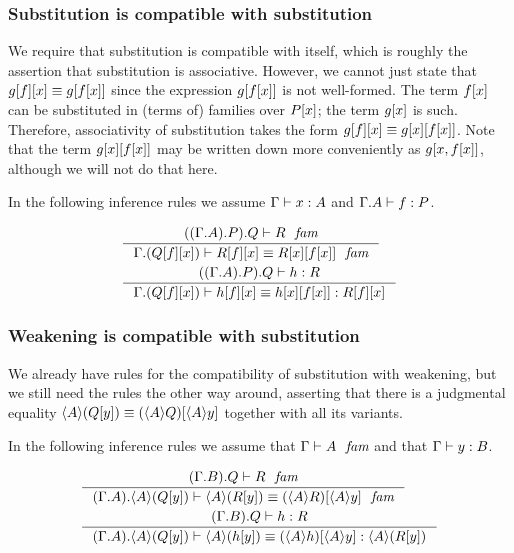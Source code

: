 \subsubsection{Substitution is compatible with substitution}\label{comp-ss}

We require that substitution is compatible with itself, which is roughly the
assertion that substitution is associative. However, we cannot just state that
$\subst{x}{{f}{g}}\jdeq\subst{{x}{f}}{g}$ since the expression $\subst{{x}{f}}{g}$
is not well-formed. The term $\subst{x}{f}$ can be substituted in (terms of) families over
$\subst{x}{P}$; the term $\subst{x}{g}$ is such. Therefore, associativity of
substitution takes the form $\subst{x}{{f}{g}}\jdeq\subst{{x}{f}}{{x}{g}}$.
Note that the term $\subst{{x}{f}}{{x}{g}}$ may be written down more conveniently
as $\subst{x,\subst{x}{f}}{g}$, although we will not do that here.

In the following inference rules we assume
$\jterm{\Gamma}{A}{x}$ and $\jterm{{\Gamma}{A}}{P}{f}$.

\begin{align}
& \inference
  {\jfam{{{{\Gamma}{A}}{P}}{Q}}{R}}
  {\jfameq{{\Gamma}{\subst{x}{{f}{Q}}}}{\subst{x}{{f}{R}}}{\subst{{x}{f}}{{x}{R}}}}
  \label{comp-ss-f}\\
& \inference
  {\jterm{{{{\Gamma}{A}}{P}}{Q}}{R}{h}}
  {\jtermeq{{\Gamma}{\subst{x}{{f}{Q}}}}{\subst{x}{{f}{R}}}{\subst{x}{{f}{h}}}{\subst{{x}{f}}{{x}{h}}}}
  \label{comp-ss-t}
\end{align}

\subsubsection{Weakening is compatible with substitution}\label{comp-ws}
We already have rules for the compatibility of substitution with weakening, but
we still need the rules the other way around, asserting that there is a 
judgmental equality $\ctxwk{A}{\subst{y}{Q}}\jdeq\subst{\ctxwk{A}{y}}{\ctxwk{A}{Q}}$
together with all its variants.

In the following inference rules we assume that $\jfam{\Gamma}{A}$ and that
$\jterm{\Gamma}{B}{y}$.

\begin{align}
& \inference
  {\jfam{{{\Gamma}{B}}{Q}}{R}}
  {\jfameq{{{\Gamma}{A}}{\ctxwk{A}{\subst{y}{Q}}}}{\ctxwk{A}{\subst{y}{R}}}{\subst{\ctxwk{A}{y}}{\ctxwk{A}{R}}}}
  \label{comp-ws-f}\\
& \inference
  {\jterm{{{\Gamma}{B}}{Q}}{R}{h}}
  {\jtermeq{{{\Gamma}{A}}{\ctxwk{A}{\subst{y}{Q}}}}{\ctxwk{A}{\subst{y}{R}}}{\ctxwk{A}{\subst{y}{h}}}{\subst{\ctxwk{A}{y}}{\ctxwk{A}{h}}}}
  \label{comp-ws-t}
\end{align}


